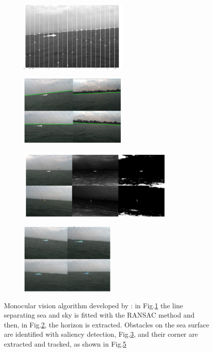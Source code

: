\documentclass[12pt]{article}
\begin{document}
      \begin{figure}
            \centering

            \begin{subfigure}[b]{.40\linewidth}
            \includegraphics[width=\linewidth, height= 3.5cm]{./Images/Wang/line-fitting}
            \caption{}\label{fig:line-fitting}
            \end{subfigure}
            \begin{subfigure}[b]{.40\linewidth}
            \includegraphics[width=\linewidth, height= 3.5cm]{./Images/Wang/horizon}
            \caption{}\label{fig:horizon}
            \end{subfigure}

            \begin{subfigure}[b]{.40\linewidth}
            \includegraphics[width=\linewidth, height= 3.5cm]{./Images/Wang/saliency}
            \caption{}\label{fig:saliency}
            \end{subfigure}
            \begin{subfigure}[b]{.40\linewidth}
            \includegraphics[width=\linewidth, height= 3.5cm]{./Images/Wang/corner}
            \caption{}\label{fig:corner}
            \end{subfigure}
            \caption{Monocular vision algorithm developed by \textcite{Wang2011}: in Fig.\ref{fig:line-fitting} the line separating sea and sky is fitted with the RANSAC method and then, in Fig.\ref{fig:horizon}, the horizon is extracted. Obstacles on the sea surface are identified with saliency detection, Fig.\ref{fig:saliency}, and their corner are extracted and tracked, as shown in Fig.\ref{fig:corner}}
      \end{figure}
\end{document}
